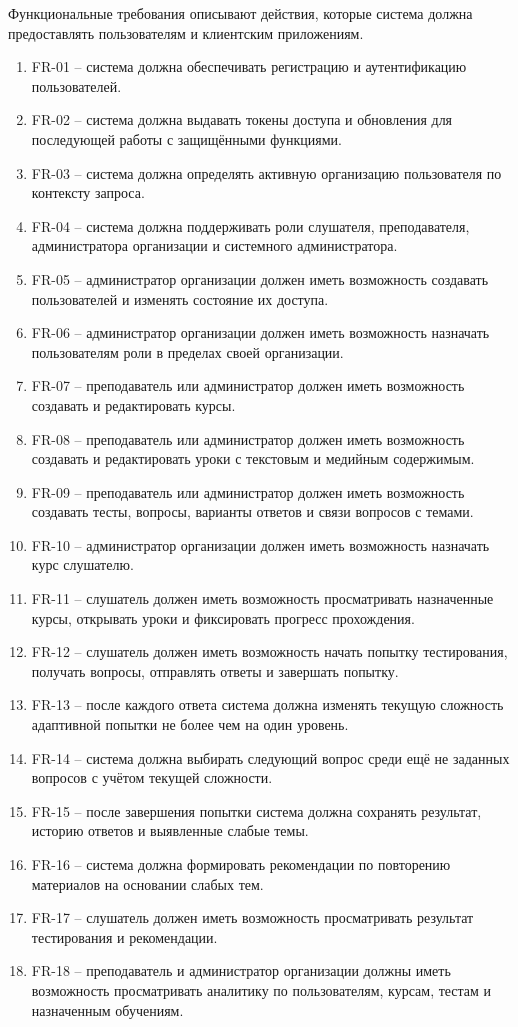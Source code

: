 Функциональные требования описывают действия, которые система должна предоставлять пользователям и клиентским приложениям.
\begin{enumerate}
  \item FR-01 -- система должна обеспечивать регистрацию и аутентификацию пользователей.
  \item FR-02 -- система должна выдавать токены доступа и обновления для последующей работы с защищёнными функциями.
  \item FR-03 -- система должна определять активную организацию пользователя по контексту запроса.
  \item FR-04 -- система должна поддерживать роли слушателя, преподавателя, администратора организации и системного администратора.
  \item FR-05 -- администратор организации должен иметь возможность создавать пользователей и изменять состояние их доступа.
  \item FR-06 -- администратор организации должен иметь возможность назначать пользователям роли в пределах своей организации.
  \item FR-07 -- преподаватель или администратор должен иметь возможность создавать и редактировать курсы.
  \item FR-08 -- преподаватель или администратор должен иметь возможность создавать и редактировать уроки с текстовым и медийным содержимым.
  \item FR-09 -- преподаватель или администратор должен иметь возможность создавать тесты, вопросы, варианты ответов и связи вопросов с темами.
  \item FR-10 -- администратор организации должен иметь возможность назначать курс слушателю.
  \item FR-11 -- слушатель должен иметь возможность просматривать назначенные курсы, открывать уроки и фиксировать прогресс прохождения.
  \item FR-12 -- слушатель должен иметь возможность начать попытку тестирования, получать вопросы, отправлять ответы и завершать попытку.
  \item FR-13 -- после каждого ответа система должна изменять текущую сложность адаптивной попытки не более чем на один уровень.
  \item FR-14 -- система должна выбирать следующий вопрос среди ещё не заданных вопросов с учётом текущей сложности.
  \item FR-15 -- после завершения попытки система должна сохранять результат, историю ответов и выявленные слабые темы.
  \item FR-16 -- система должна формировать рекомендации по повторению материалов на основании слабых тем.
  \item FR-17 -- слушатель должен иметь возможность просматривать результат тестирования и рекомендации.
  \item FR-18 -- преподаватель и администратор организации должны иметь возможность просматривать аналитику по пользователям, курсам, тестам и назначенным обучениям.
\end{enumerate}

